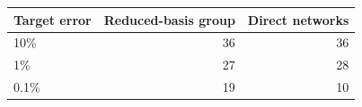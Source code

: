 \begin{tabular}{lrr}
\toprule
Target error & Reduced-basis group & Direct networks \\
\midrule
10\% & 36 & 36 \\
1\% & 27 & 28 \\
0.1\% & 19 & 10 \\
\bottomrule
\end{tabular}
